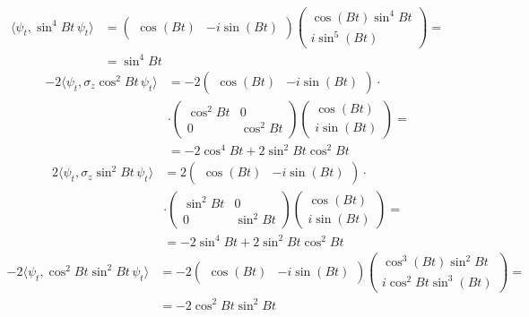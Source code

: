 \documentclass{article}
\begin{document}
\[
    \begin{split}
        \langle \psi_t, \sin^4{Bt}\, \psi_t \rangle &= \begin{pmatrix}
            \cos{(Bt)} & -i \sin{(Bt)}
        \end{pmatrix}
        \begin{pmatrix}
            \cos{(Bt)}\sin^4{Bt}\\ 
            i \sin^5{(Bt)}
        \end{pmatrix}=\\
        &= \sin^4{Bt}
    \end{split}
\]
\[
    \begin{split}
       -2 \langle \psi_t, \sigma_z \cos^2{Bt}\, \psi_t \rangle &= -2 \begin{pmatrix}
            \cos{(Bt)} & -i \sin{(Bt)}
        \end{pmatrix}\cdot\\
        &\cdot\begin{pmatrix}
            \cos^2{Bt} & 0\\
            0 & \cos^2{Bt}
        \end{pmatrix}
        \begin{pmatrix}
            \cos{(Bt)}\\ 
            i \sin{(Bt)}
        \end{pmatrix}=\\
        &= -2\cos^4{Bt} +2 \sin^2{Bt}\cos^2{Bt}
    \end{split}
\]
\[
    \begin{split}
       2 \langle \psi_t, \sigma_z \sin^2{Bt}\, \psi_t \rangle &= 2 \begin{pmatrix}
            \cos{(Bt)} & -i \sin{(Bt)}
        \end{pmatrix}\cdot\\
        &\cdot\begin{pmatrix}
            \sin^2{Bt} & 0\\
            0 & \sin^2{Bt}
        \end{pmatrix}
        \begin{pmatrix}
            \cos{(Bt)}\\ 
            i \sin{(Bt)}
        \end{pmatrix}=\\
        &= - 2\sin^4{Bt} + 2 \sin^2{Bt}\cos^2{Bt}
    \end{split}
\]
\[
    \begin{split}
        -2 \langle \psi_t, \cos^2{Bt}\sin^2{Bt}\, \psi_t \rangle &= -2\begin{pmatrix}
            \cos{(Bt)} & -i \sin{(Bt)}
        \end{pmatrix}
        \begin{pmatrix}
            \cos^3{(Bt)}\sin^2{Bt}\\ 
            i \cos^2{Bt}\sin^3{(Bt)}
        \end{pmatrix}=\\
        &= -2 \cos^2{Bt}\sin^2{Bt}
    \end{split}
\]
\end{document}
